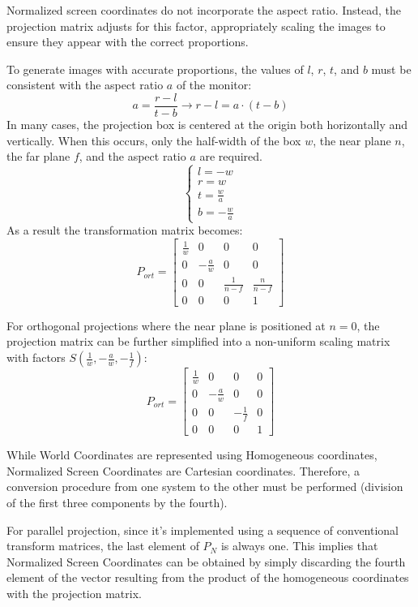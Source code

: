Normalized screen coordinates do not incorporate the aspect ratio. 
Instead, the projection matrix adjusts for this factor, appropriately scaling the images to ensure they appear with the correct proportions.

To generate images with accurate proportions, the values of $l$, $r$, $t$, and $b$ must be consistent with the aspect ratio $a$ of the monitor: 
\[a=\dfrac{r-l}{t-b}\rightarrow r-l=a\cdot (t-b)\]
In many cases, the projection box is centered at the origin both horizontally and vertically. 
When this occurs, only the half-width of the box $w$, the near plane $n$, the far plane $f$, and the aspect ratio $a$ are required.
\[\begin{cases}
    l=-w \\
    r=w \\
    t=\frac{w}{a} \\
    b=-\frac{w}{a}
\end{cases}\]
As a result the transformation matrix becomes: 
\[P_{ort}=\begin{bmatrix}
    \frac{1}{w} & 0 & 0 & 0 \\ 
    0 & -\frac{a}{w} & 0 & 0 \\ 
    0 & 0 & \frac{1}{n-f} & \frac{n}{n-f} \\ 
    0 & 0 & 0 & 1 
\end{bmatrix}\]

For orthogonal projections where the near plane is positioned at $n=0$, the projection matrix can be further simplified into a non-uniform scaling matrix with factors $S(\frac{1}{w}, -\frac{a}{w}, -\frac{1}{f})$:
\[P_{ort}=\begin{bmatrix}
    \frac{1}{w} & 0 & 0 & 0 \\ 
    0 & -\frac{a}{w} & 0 & 0 \\ 
    0 & 0 & -\frac{1}{f} & 0 \\ 
    0 & 0 & 0 & 1 
\end{bmatrix}\]

While World Coordinates are represented using Homogeneous coordinates, Normalized Screen Coordinates are Cartesian coordinates. 
Therefore, a conversion procedure from one system to the other must be performed (division of the first three components by the fourth).

For parallel projection, since it's implemented using a sequence of conventional transform matrices, the last element of $P_N$ is always one. 
This implies that Normalized Screen Coordinates can be obtained by simply discarding the fourth element of the vector resulting from the product of the homogeneous coordinates with the projection matrix.

